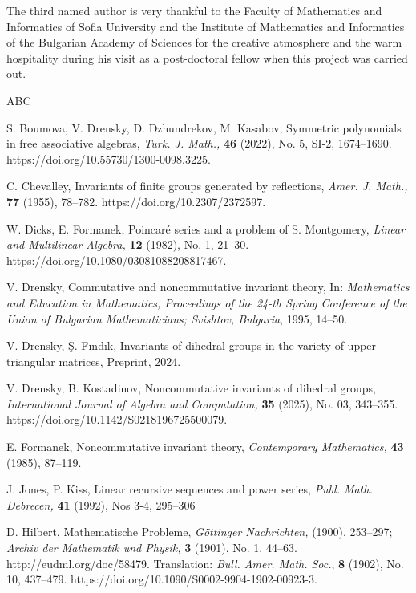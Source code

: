 \documentclass{amsart}[12pt]
\theoremstyle{definition}
\begin{document}
The third named author is very thankful to the Faculty of Mathematics and Informatics of
Sofia University and the Institute of Mathematics and Informatics of
the Bulgarian Academy of Sciences for the creative atmosphere and the warm hospitality during his visit
as a post-doctoral fellow when this project was carried out.

\begin{thebibliography}{ABC}

S. Boumova, V. Drensky, D. Dzhundrekov, M. Kasabov,
Symmetric polynomials in free associative algebras,
{\em Turk. J. Math.,} {\bf 46} (2022), No. 5, SI-2, 1674--1690.
https://doi.org/10.55730/1300-0098.3225.

C. Chevalley,
Invariants of finite groups generated by reflections,
{\em Amer. J. Math.,} {\bf 77} (1955), 78--782.
https://doi.org/10.2307/2372597.

W. Dicks, E. Formanek,
Poincar\'e series and a problem of S. Montgomery,
{\em Linear and Multilinear Algebra,} {\bf 12} (1982), No. 1, 21--30.
https://doi.org/10.1080/03081088208817467.

V. Drensky,
Commutative and noncommutative invariant theory,
In: {\em Mathematics and Education in Mathematics,
Proceedings of the 24-th Spring Conference of the Union of Bulgarian Mathematicians; Svishtov, Bulgaria}, 1995, 14--50.

V. Drensky, {\c S}. F{\i}nd{\i}k,
Invariants of dihedral groups in the variety of upper triangular matrices, Preprint, 2024.

V. Drensky, B. Kostadinov,
Noncommutative invariants of dihedral groups,
{\em International Journal of Algebra and Computation,} {\bf 35} (2025), No. 03, 343--355.
https://doi.org/10.1142/S0218196725500079.

E. Formanek,
Noncommutative invariant theory,
{\it Contemporary Mathematics,} {\bf 43} (1985), 87--119.

J. Jones, P. Kiss,
Linear recursive sequences and power series,
{\em Publ. Math. Debrecen,} {\bf 41} (1992), Nos 3-4, 295--306

D. Hilbert,
Mathematische Probleme,
{\em G\"ottinger Nachrichten,} (1900), 253--297;
{\em Archiv der Mathematik und Physik,} {\bf 3} (1901), No. 1, 44--63.
http://eudml.org/doc/58479.
Translation: {\em Bull. Amer. Math. Soc.}, {\bf 8} (1902), No. 10, 437--479.
https://doi.org/10.1090/S0002-9904-1902-00923-3.


\end{thebibliography}
\end{document}
